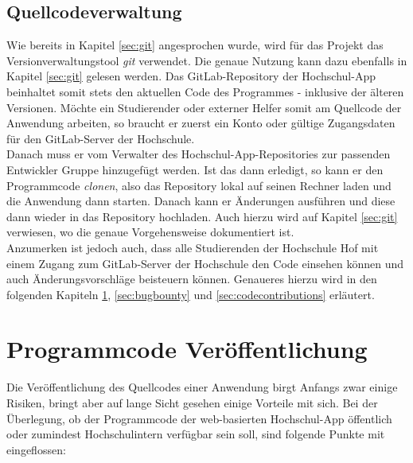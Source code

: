 \subsection*{Quellcodeverwaltung}
\label{sec:quellcodeverwaltung}

Wie bereits in Kapitel \ref{sec:git} angesprochen wurde, wird für das Projekt das Versionverwaltungstool \textit{git} verwendet. Die genaue Nutzung kann dazu ebenfalls in Kapitel \ref{sec:git} gelesen werden. Das GitLab-Repository der Hochschul-\ac{App} beinhaltet somit stets den aktuellen Code des Programmes - inklusive der älteren Versionen. Möchte ein Studierender oder externer Helfer somit am Quellcode der Anwendung arbeiten, so braucht er zuerst ein Konto oder gültige Zugangsdaten für den GitLab-Server der Hochschule.\\
\linebreak
Danach muss er vom Verwalter des Hochschul-\ac{App}-Repositories zur passenden Entwickler Gruppe hinzugefügt werden. Ist das dann erledigt, so kann er den Programmcode \textit{clonen}, also das Repository lokal auf seinen Rechner laden und die Anwendung dann starten. Danach kann er Änderungen ausführen und diese dann wieder in das Repository hochladen. Auch hierzu wird auf Kapitel \ref{sec:git} verwiesen, wo die genaue Vorgehensweise dokumentiert ist.\\
\linebreak
Anzumerken ist jedoch auch, dass alle Studierenden der Hochschule Hof mit einem Zugang zum GitLab-Server der Hochschule den Code einsehen können und auch Änderungsvorschläge beisteuern können. Genaueres hierzu wird in den folgenden Kapiteln \ref{sec:openource}, \ref{sec:bugbounty} und \ref{sec:codecontributions} erläutert.

\section{Programmcode Veröffentlichung}
\label{sec:openource}

Die Veröffentlichung des Quellcodes einer Anwendung birgt Anfangs zwar einige Risiken, bringt aber auf lange Sicht gesehen einige Vorteile mit sich. Bei der Überlegung, ob der Programmcode der web-basierten Hochschul-\ac{App} öffentlich oder zumindest Hochschulintern verfügbar sein soll, sind folgende Punkte mit eingeflossen:\\

